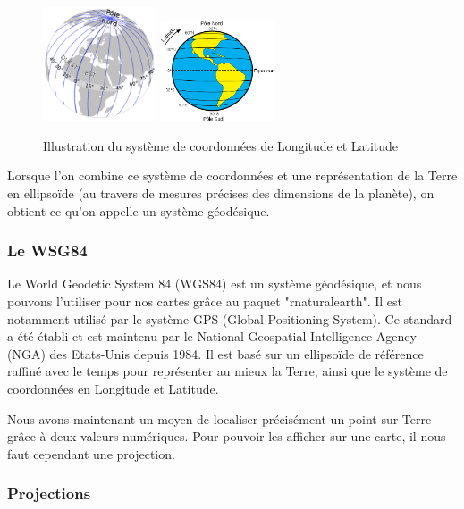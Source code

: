 \documentclass{article}
\begin{document}
\begin{figure}[htp]
    \centering
    \includegraphics[width=0.3\textwidth]{Images/Cartographie/Longitude.png}
    \includegraphics[width=0.3\textwidth]{Images/Cartographie/Latitude.png}
    \caption{Illustration du système de coordonnées de Longitude et Latitude}
    \label{fig:longitude_et_latitude}
\end{figure}

Lorsque l'on combine ce système de coordonnées et une représentation de la Terre en ellipsoïde (au travers de mesures précises des dimensions de la planète), on obtient ce qu'on appelle un système géodésique.

\subsubsection{Le WSG84}

Le World Geodetic System 84 (WGS84) \cite{wgs84} est un système géodésique, et nous pouvons l'utiliser pour nos cartes grâce au paquet "rnaturalearth". Il est notamment utilisé par le système GPS (Global Positioning System). Ce standard a été établi et est maintenu par le National Geospatial Intelligence Agency (NGA) des Etats-Unis \cite{enwiki:1065796786} depuis 1984. Il est basé sur un ellipsoïde de référence raffiné avec le temps pour représenter au mieux la Terre, ainsi que le système de coordonnées en Longitude et Latitude.

Nous avons maintenant un moyen de localiser précisément un point sur Terre grâce à deux valeurs numériques. Pour pouvoir les afficher sur une carte, il nous faut cependant une projection.

\subsubsection{Projections}
\end{document}
